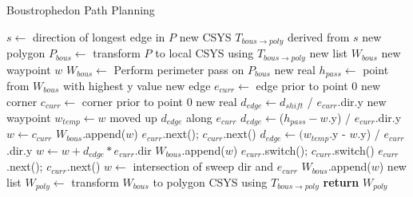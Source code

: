 \begin{algorithm}[!htbp]
\caption{Boustrophedon Path Planning}\label{alg:boustrophedon}
\begin{algorithmic}[1]
		\State $s \leftarrow$ direction of longest edge in $P$
	\EndIf
	\State new CSYS $T_{bous\rightarrow poly}$ derived from $s$
	\State new polygon $P_{bous} \leftarrow$ transform $P$ to local CSYS using $T_{bous\rightarrow poly}$
	\State new list $W_{bous}$ 
	\State new waypoint $w$
	\State $W_{bous} \leftarrow$ Perform perimeter pass on $P_{bous}$
	\State new real $h_{pass} \leftarrow$ point from $W_{bous}$ with highest y value
	\State new edge $e_{curr} \leftarrow$ edge prior to point 0
	\State new corner $c_{curr} \leftarrow$ corner prior to point 0
		\State new real $d_{edge} \leftarrow d_{shift}$ / $e_{curr}$.dir.y
		\State new waypoint $w_{temp} \leftarrow w$ moved up $d_{edge}$ along $e_{curr}$
			\State $d_{edge} \leftarrow $($h_{pass} - w$.y) / $e_{curr}$.dir.y
			\State $w \leftarrow c_{curr}$
			\State $W_{bous}$.append($w$)
			\State $e_{curr}$.next(); $c_{curr}$.next()
			\State $d_{edge} \leftarrow (w_{temp}$.y - $w$.y) / $e_{curr}$.dir.y
		\EndIf
		\State $w \leftarrow w + d_{edge} * e_{curr}$.dir
		\State $W_{bous}$.append($w$)
		\State $e_{curr}$.switch(); $c_{curr}$.switch()
			\State $e_{curr}$.next(); $c_{curr}$.next()
		\EndWhile
		\State $w \leftarrow$ intersection of sweep dir and $e_{curr}$
		\State $W_{bous}$.append($w$)
	\EndWhile
	\State new list $W_{poly} \leftarrow$ transform $W_{bous}$ to polygon CSYS using $T_{bous\rightarrow poly}$
	\State \textbf{return} $W_{poly}$
\EndFunction
\end{algorithmic}
\end{algorithm}

